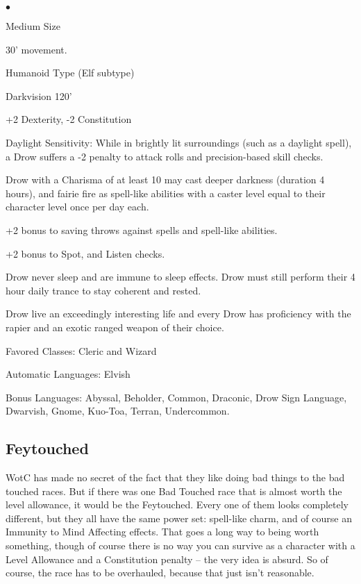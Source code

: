 \begin{list}{$\bullet$}{\itemspace}
    \item Medium Size
    \item 30' movement.
    \item Humanoid Type (Elf subtype)
    \item Darkvision 120'
    \item +2 Dexterity, -2 Constitution
    \item Daylight Sensitivity: While in brightly lit surroundings (such as a daylight spell), a Drow suffers a -2 penalty to attack rolls and precision-based skill checks.
    \item Drow with a Charisma of at least 10 may cast deeper darkness (duration 4 hours), and fairie fire as spell-like abilities with a caster level equal to their character level once per day each.
    \item +2 bonus to saving throws against spells and spell-like abilities.
    \item +2 bonus to Spot, and Listen checks.
    \item Drow never sleep and are immune to sleep effects. Drow must still perform their 4 hour daily trance to stay coherent and rested.
    \item Drow live an exceedingly interesting life and every Drow has proficiency with the rapier and an exotic ranged weapon of their choice.
    \item Favored Classes: Cleric and Wizard
    \item Automatic Languages: Elvish
    \item Bonus Languages: Abyssal, Beholder, Common, Draconic, Drow Sign Language, Dwarvish, Gnome, Kuo-Toa, Terran, Undercommon.
\end{list}


\subsection{Feytouched}
\vspace*{-8pt}

WotC has made no secret of the fact that they like doing bad things to the bad touched races. But if there was one Bad Touched race that is almost worth the level allowance, it would be the Feytouched. Every one of them looks completely different, but they all have the same power set: spell-like charm, and of course an Immunity to Mind Affecting effects. That goes a long way to being worth something, though of course there is no way you can survive as a character with a Level Allowance and a Constitution penalty -- the very idea is absurd. So of course, the race has to be overhauled, because that just isn't reasonable.

